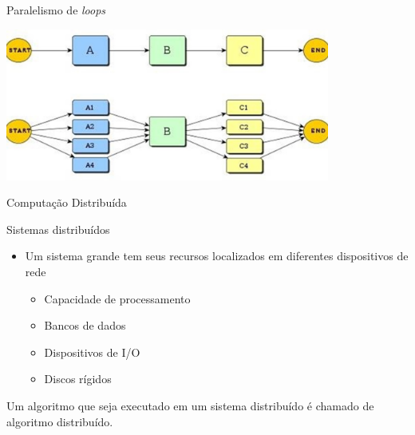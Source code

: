 \documentclass[compress]{beamer}
\begin{document}

\begin{frame}{Paralelismo de \textit{loops}}

\vspace{1cm}

\centering\includegraphics[width=0.80\textwidth]{images/parallel_for.jpg}

\end{frame}


\begin{frame}{Computação Distribuída}

Sistemas distribuídos
\begin{itemize}
    \item Um sistema grande tem seus recursos localizados em diferentes dispositivos de rede
    \begin{itemize}
        \item Capacidade de processamento
        \item Bancos de dados
        \item Dispositivos de I/O
        \item Discos rígidos
    \end{itemize}
\end{itemize}

\vspace{0.5cm}

Um algoritmo que seja executado em um sistema distribuído é chamado de algoritmo distribuído.

\end{frame}

\end{document}
